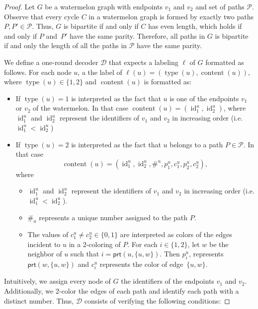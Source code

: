 \documentclass[11pt]{article}
\DeclareMathOperator{\content}{content}
\DeclareMathOperator{\id}{id}
\DeclareMathOperator{\type}{type}
\newcommand*{\ports}{\mathsf{prt}}
\begin{document}
\begin{proof}
Let $G$ be a watermelon graph with endpoints $v_1$ and $v_2$ and set of paths $\mathcal{P}$.
Observe that every cycle \( C \) in a watermelon graph is formed by exactly two paths \( P, P' \in \mathcal{P} \). Thus, \( G \) is bipartite if and only if \( C \) has even length, which holds if and only if \( P \) and~\( P' \) have the same parity. Therefore, all paths in $G$ is bipartite if and only the length of all the paths in $\mathcal{P}$ have the same parity. 

We define a one-round decoder $\mathcal{D}$ that expects a labeling $\ell$ of $G$ formatted as follows. For each node $u$, a the label of $\ell(u) = (\type(u),\content(u))$, where $\type(u) \in \{1,2\}$ and $\content(u)$ is formatted as:



\begin{itemize}
    \item If $\type(u) = 1$ is interpreted as the fact that $u$ is one of the endpoints $v_1$ or $v_2$ of the watermelon. In that case $\content(u) = (\id_1^u, \id_2^u)$, where $\id_1^u$ and $\id_2^u$ represent the identifiers of $v_1$ and $v_2$ in increasing order (i.e. $\id_1^u < \id_2^u$)
    \item If $\type(u) = 2$ is interpreted as the fact that $u$ belongs to a path $P\in \mathcal{P}$. In that case \[\content(u) = (\id^u_1, \id^u_2, \#^u, p^u_{1}, c^u_1, p^u_{2},c^u_2),\] where
    \begin{itemize}
        \item $\id_1^u$ and $\id_2^u$ represent the identifiers of $v_1$ and $v_2$ in increasing order (i.e. $\id_1^u < \id_2^u$).
        \item $\#_u$ represents a unique number assigned to the path $P$.
        \item The values of $c^u_1 \neq c^u_2\in \{0,1\}$ are interpreted as colors of the edges incident to $u$ in a $2$-coloring of $P$. 
        For each $i\in \{1,2\}$,  let $w$ be the neighbor of $u$ such that $i=\ports(u,\{u,w\})$. Then $p^u_{i}$,  represents $\ports(w, \{u,w\})$ and $c^u_i$ represents the color of edge~$\{u,w\}$. 

    
        
    \end{itemize}
\end{itemize}
Intuitively, we assign every node of \( G \) the identifiers of the endpoints \( v_1 \) and \( v_2 \). Additionally, we 2-color the edges of each path and identify each path with a distinct number. Thus, \( \mathcal{D} \) consists of verifying the following conditions:


\end{proof}
\end{document}

